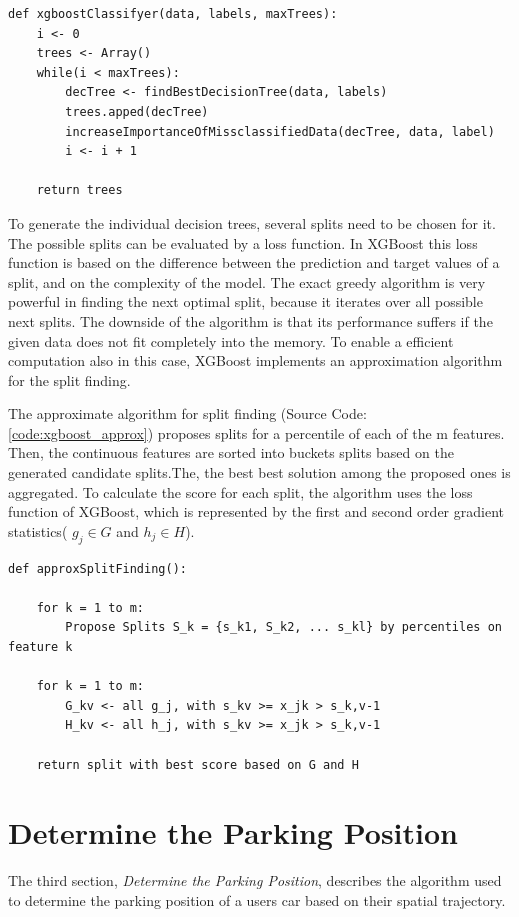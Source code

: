 \begin{lstlisting}[style=py, caption={Pseudocode: Basic XGBoost}, label={code:xgboost}]
def xgboostClassifyer(data, labels, maxTrees):
    i <- 0
    trees <- Array()
    while(i < maxTrees):
        decTree <- findBestDecisionTree(data, labels)
        trees.apped(decTree)
        increaseImportanceOfMissclassifiedData(decTree, data, label)
        i <- i + 1
    
    return trees
\end{lstlisting}

To generate the individual decision trees, several splits need to be chosen for it. The possible splits can be evaluated by a loss function. In XGBoost this loss function is based on the difference between the prediction and target values of a split, and on the complexity of the model. The exact greedy algorithm is very powerful in finding the next optimal split, because it iterates over all possible next splits. The downside of the algorithm is that its performance suffers if the given data does not fit completely into the memory. To enable a efficient computation also in this case, XGBoost implements an approximation algorithm for the split finding. \cite{chen2016xgboost}

The approximate algorithm for split finding (Source Code: \ref{code:xgboost_approx}) proposes splits for a percentile of each of the m features. Then, the continuous features are sorted into buckets splits based on the generated candidate splits.The, the best best solution among the proposed ones is aggregated. To calculate the score for each split, the algorithm uses the loss function of XGBoost, which is represented by the first and second order gradient statistics( $g_j \in G$ and $h_j \in H$). 

\begin{lstlisting}[style=py, caption={Pseudocode: XGBoost - Approximate Algorithm for Split Finding \cite{chen2016xgboost} }, label={code:xgboost_approx}]
def approxSplitFinding():
    
    for k = 1 to m:
        Propose Splits S_k = {s_k1, S_k2, ... s_kl} by percentiles on feature k
    
    for k = 1 to m:
        G_kv <- all g_j, with s_kv >= x_jk > s_k,v-1
        H_kv <- all h_j, with s_kv >= x_jk > s_k,v-1
    
    return split with best score based on G and H
\end{lstlisting}

\section{Determine the Parking Position}
The third section, \textit{Determine the Parking Position}, describes the algorithm used to determine the parking position of a users car based on their spatial trajectory. 

